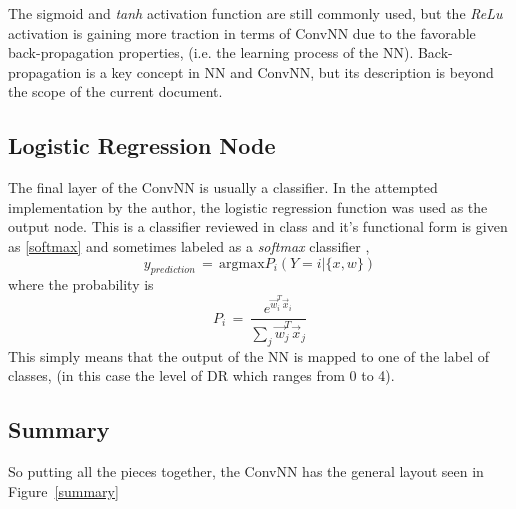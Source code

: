 \documentclass[letterpaper,12pt]{article}
\newcommand{\figref}[1]{Figure~\ref{#1}}
\begin{document}
The sigmoid and \textit{tanh} activation function are still commonly used, but the \textit{ReLu} activation is gaining more traction in terms of ConvNN due to the favorable back-propagation properties, (i.e. the learning process of the NN). Back-propagation is a key concept in NN and ConvNN, but its description is beyond the scope of the current document.

\subsection{Logistic Regression Node}

The final layer of the ConvNN is usually a classifier. In the attempted implementation by the author, the logistic regression function was used as the output node. This is a classifier reviewed in class and it's functional form is  given as \eqref{softmax} and sometimes labeled as a \textit{softmax} classifier \cite{deep},
\begin{equation}
y_{prediction} \, = \, \text{argmax} P_i (Y = i | \{x, w\})
\label{softmax}
\end{equation}
where the probability is
\begin{equation}
P_i \, = \, \frac{e^{\vec{w}_i^T \vec{x}_i}}{\sum_j \vec{w}_j^T \vec{x}_j }
\end{equation}
This simply means that the output of the NN is mapped to one of the label of classes, (in this case the level of DR which ranges from 0 to 4).

\subsection{Summary}

So putting all the pieces together,  the ConvNN has the general layout seen in \figref{summary}
\end{document}
